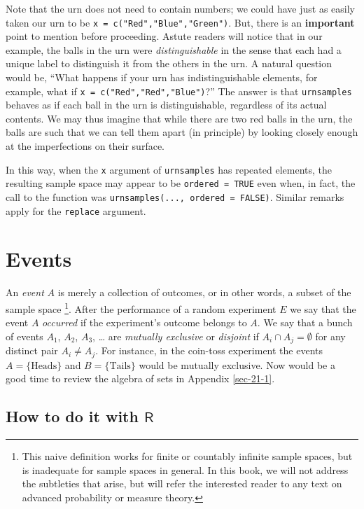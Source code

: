 \documentclass[captions=tableheading]{scrbook}
\begin{document}
Note that the urn does not need to contain numbers; we could have just as easily taken our urn to be \texttt{x = c("Red","Blue","Green")}. But, there is an \textbf{important} point to mention before proceeding. Astute readers will notice that in our example, the balls in the urn were \emph{distinguishable} in the sense that each had a unique label to distinguish it from the others in the urn. A natural question would be, ``What happens if your urn has indistinguishable elements, for example, what if \texttt{x = c("Red","Red","Blue")}?'' The answer is that \texttt{urnsamples} behaves as if each ball in the urn is distinguishable, regardless of its actual contents. We may thus imagine that while there are two red balls in the urn, the balls are such that we can tell them apart (in principle) by looking closely enough at the imperfections on their
surface.

In this way, when the \texttt{x} argument of \texttt{urnsamples} has repeated elements, the resulting sample space may appear to be \texttt{ordered = TRUE} even when, in fact, the call to the function was \texttt{urnsamples(..., ordered = FALSE)}. Similar remarks apply for the \texttt{replace} argument. 
\section{Events}
\label{sec-4-2}
\label{sec-Events}


An \emph{event} \(A\) is merely a collection of outcomes, or in other words, a subset of the sample space
\footnote{This naive definition works for finite or countably infinite sample spaces, but is inadequate for sample spaces in general. In this book, we will not address the subtleties that arise, but will refer the interested reader to any text on advanced probability or measure theory.}.
After the performance of a random experiment \(E\) we say that the event \(A\) \emph{occurred} if the experiment's outcome belongs to \(A\). We say that a bunch of events \(A_{1}\), \(A_{2}\), \(A_{3}\), \ldots{} are \emph{mutually exclusive} or \emph{disjoint} if \(A_{i}\cap A_{j}=\emptyset\) for any distinct pair \(A_{i}\neq A_{j}\). For instance, in the coin-toss experiment the events \( A = \{ \mbox{Heads} \}\) and \( B = \{ \mbox{Tails} \} \) would be mutually exclusive. Now would be a good time to review the algebra of sets in Appendix \ref{sec-21-1}.
\subsection{How to do it with \(\mathsf{R}\)}
\label{sec-4-2-1}
\end{document}
